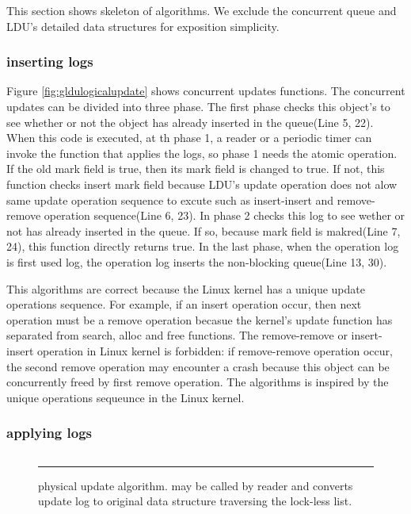 This section shows skeleton of algorithms.
We exclude the concurrent queue and LDU's detailed data structures for
exposition simplicity.


\subsubsection{inserting logs}
Figure \ref{fig:gldulogicalupdate} shows concurrent updates functions.
The concurrent updates can be divided into three phase.
The first phase checks this object's to see whether or not the
object has already inserted in the queue(Line 5, 22).
When this code is executed, at th phase 1, a reader or a periodic timer can
invoke the  function that applies the logs, so
phase 1 needs the atomic operation.
If the old mark field is true, then its mark field is changed to true.
If not, this function checks insert mark field because LDU's update operation
does not alow same update operation sequence to excute such as insert-insert
and remove-remove operation sequence(Line 6, 23).
In phase 2 checks this log to see wether or not has already inserted in
the queue.
If so, because mark field is makred(Line 7, 24), this function directly returns
true.
In the last phase, when the operation log is first used log, the
operation log inserts the non-blocking queue(Line 13, 30).

This algorithms are correct because the Linux kernel has a unique update
operations sequence.
For example, if an insert operation occur, then next operation must be a remove
operation becasue the kernel's update function has separated from search, alloc
and free functions.
The remove-remove or insert-insert operation in Linux kernel is
forbidden: if remove-remove operation occur, the second remove operation may
encounter a crash because this object can be concurrently freed by first remove
operation.
The algorithms is inspired by the unique operations sequeunce in the
Linux kernel.

\subsubsection{applying logs}
\begin{figure}[tb]
\begin{center}
\inputminted[linenos,fontsize=\footnotesize, tabsize=2]{c}{src/ldu_physical.c}
\end{center}
\rule{\columnwidth}{0.5pt}
\vspace{-\baselineskip}
\caption{ physical update algorithm.  may be
 called by reader and converts update log to original data structure
 traversing the lock-less list.}
\label{fig:glduphysicalupdate}
\end{figure}


